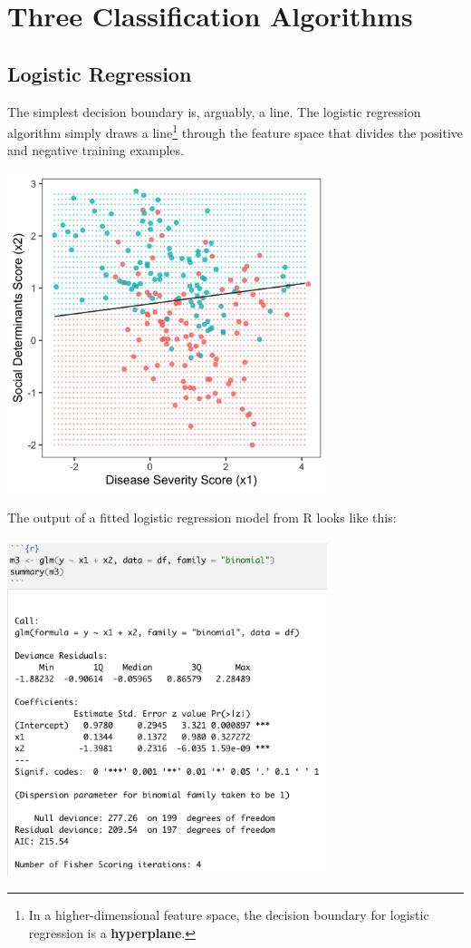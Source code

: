 \section{Three Classification Algorithms}

\subsection{Logistic Regression \label{ssect:logreg}}

The simplest decision boundary is, arguably, a line. The logistic regression algorithm simply draws a line\footnote{In a higher-dimensional feature space, the decision boundary for logistic regression is a \textbf{hyperplane}.} through the feature space that divides the positive and negative training examples. 

\begin{center}
\includegraphics[width=0.7\textwidth]{img/esl-logistic.png}
\end{center}

\noindent The output of a fitted logistic regression model from R looks like this:

\begin{center}
\includegraphics[width=0.7\textwidth]{img/glm-binomial-example.png}
\end{center}

